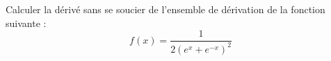 \documentclass[a4paper,fleqn]{article}
\date{\today}
\begin{document}
Calculer la dérivé sans se soucier de l'ensemble de dérivation de la fonction suivante :
$$ f(x) = \frac{1}{2(e^x+e^{-x})^2} $$
\end{document}

